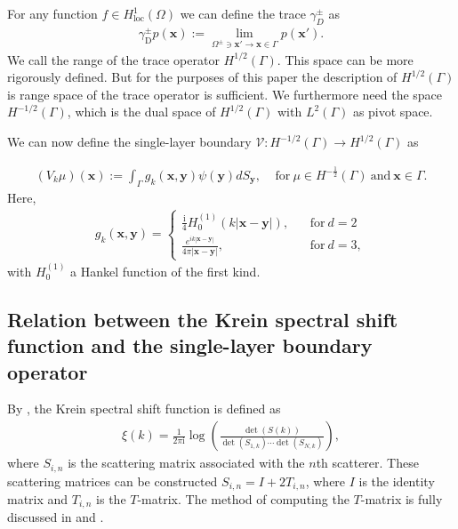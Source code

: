 For any function $f\in H_{\text{loc}}^1(\Omega)$ we can define the trace $\gamma_{D}^{\pm}$ as
\begin{align*}
    \gamma_{\text{D}}^{\pm}p(\boldsymbol{x}):=\lim_{\Omega^{\pm}\ni\boldsymbol{x'}\rightarrow\boldsymbol{x}\in\Gamma}p(\boldsymbol{x'}).
\end{align*}
We call the range of the trace operator $H^{1/2}(\Gamma)$. This space can be more rigorously defined. But for the purposes of this paper the description of $H^{1/2}(\Gamma)$ is range space of the trace operator is sufficient. We furthermore need the space $H^{-1/2}(\Gamma)$, which is the dual space of $H^{1/2}(\Gamma)$ with $L^2(\Gamma)$ as pivot space.

We can now define the single-layer boundary $\mathcal{V}:H^{-1/2}(\Gamma)\rightarrow H^{1/2}(\Gamma)$ as

\begin{align*}
    (V_{k}\mu)(\boldsymbol{x}) := \int_{\Gamma}g_{k}(\boldsymbol{x},\boldsymbol{y})\psi(\boldsymbol{y})dS_{\boldsymbol{y}}, \ \ \ \ \ 
    \text{for}\ \mu\in H^{-\frac{1}{2}}(\Gamma) \  \text{and} \ \boldsymbol{x}\in\Gamma.
\end{align*}
Here, 
\begin{align}\label{Green's function}
    g_{k}(\boldsymbol{x},\boldsymbol{y}) = \begin{cases}
          \frac{\mathrm{i}}{4}H_{0}^{(1)}(k|\boldsymbol{x}-\boldsymbol{y}|), \ \ \ \ &\text{for} \ d = 2\\
          \frac{e^{ik|\boldsymbol{x}-\boldsymbol{y}|}}{4\pi|\boldsymbol{x} - \boldsymbol{y}|}, \ \ \ \ &\text{for} \ d = 3,
        \end{cases}
\end{align}
with $H_{0}^{(1)}$  a Hankel function of the first kind.



\subsection{Relation between the Krein spectral shift function and the single-layer boundary operator}
By \cite{hanisch2020relative}, the Krein spectral shift function is defined as 
\begin{align*}
    \xi(k) = \frac{1}{2\pi \mathrm{i}}\log\left(\frac{\det(S(k))}{\det(S_{1,k})\cdots\det(S_{N,k})}\right),
\end{align*}
where $S_{i,n}$ is the scattering matrix associated with the $n$th scatterer. These scattering matrices can be constructed  $S_{i,n} = I + 2T_{i,n}$, where 
$I$ is the identity matrix and $T_{i,n}$ is the $T$-matrix. The method of computing the $T$-matrix is fully discussed in \cite{waterman1969new} and 
\cite{ganesh2008far}.

